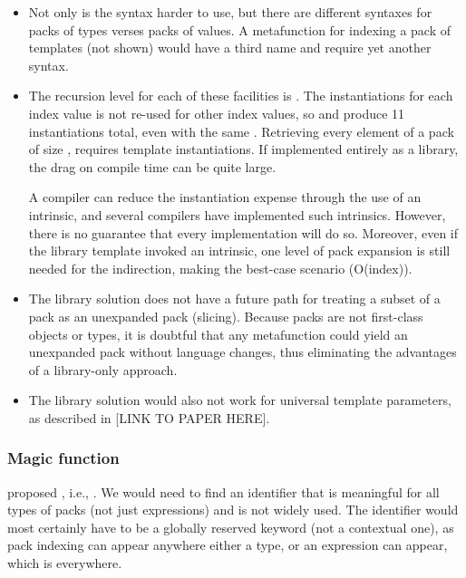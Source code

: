 \documentclass{wg21}
\begin{document}
\begin{itemize}
\item Not only is the syntax harder to use, but there are different syntaxes
  for packs of types verses packs of values. A metafunction for indexing a pack
  of templates (not shown) would have a third name and require yet another
  syntax.
\item The recursion level for each of these facilities is
  . The instantiations for each index value is not re-used for
  other index values, so  and
   produce 11 instantiations total, even with the
  same .  Retrieving every element of a pack of size ,
  requires  template instantiations.  If implemented entirely as
  a library, the drag on compile time can be quite large.

  A compiler can reduce the instantiation expense through the use of an
  intrinsic, and several compilers have implemented such intrinsics.  However,
  there is no guarantee that every implementation will do so.  Moreover, even
  if the library template invoked an intrinsic, one level of pack expansion is
  still needed for the indirection, making the best-case scenario
  \mathtt(O(index)).
\item The library solution does not have a future path for
  treating a subset of a pack as an unexpanded pack (slicing). Because packs
  are not first-class objects or types, it is doubtful that any metafunction
  could yield an unexpanded pack without language changes, thus eliminating the
  advantages of a library-only approach.
\item The library solution would also not work for universal template
  parameters, as described in [LINK TO PAPER HERE].
\end{itemize}

\subsubsection{Magic function}

 proposed , i.e., .
We would need to find an identifier that is meaningful for all types of packs (not just expressions) and is not widely used.
The identifier would most certainly have to be a globally reserved keyword (not a contextual one), as pack indexing can appear anywhere either a type, or an expression can appear, which is everywhere.
\end{document}
